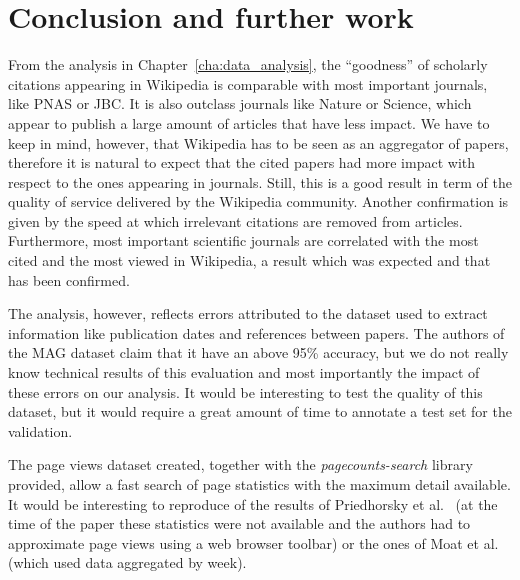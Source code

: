 \cleardoublepage{}
\chapter{Conclusion and further work}
\label{cha:conclusion}
From the analysis in Chapter~\ref{cha:data_analysis}, the ``goodness'' of scholarly citations appearing in Wikipedia is comparable with most important journals, like PNAS or JBC.
It is also outclass journals like Nature or Science, which appear to publish a large amount of articles that have less impact.
We have to keep in mind, however, that Wikipedia has to be seen as an aggregator of papers, therefore it is natural to expect that the cited papers had more impact with respect to the ones appearing in journals.
Still, this is a good result in term of the quality of service delivered by the Wikipedia community.
Another confirmation is given by the speed at which irrelevant citations are removed from articles.
Furthermore, most important scientific journals are correlated with the most cited and the most viewed in Wikipedia, a result which was expected and that has been confirmed.

The analysis, however, reflects errors attributed to the dataset used to extract information like publication dates and references between papers.
The authors of the \ac{MAG} dataset claim that it have an above 95\% accuracy, but we do not really know technical results of this evaluation and most importantly the impact of these errors on our analysis.
It would be interesting to test the quality of this dataset, but it would require a great amount of time to annotate a test set for the validation.

The page views dataset created, together with the \emph{pagecounts-search} library provided, allow a fast search of page statistics with the maximum detail available.
It would be interesting to reproduce of the results of Priedhorsky et al.~\cite{Priedhorsky2007} (at the time of the paper these statistics were not available and the authors had to approximate page views using a web browser toolbar)
or the ones of Moat et al.~\cite{Moat2013} (which used data aggregated by week).
